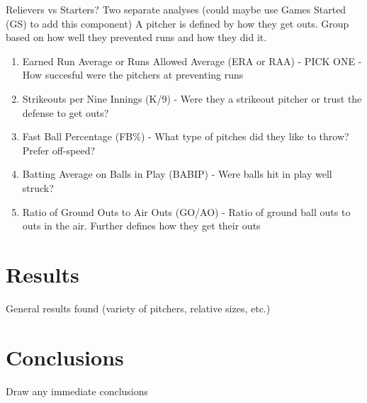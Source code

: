 \documentclass{article}
\begin{document}
Relievers vs Starters?  Two separate analyses (could maybe use Games Started (GS) to add this component)
A pitcher is defined by how they get outs.  Group based on how well they prevented runs and how they did it.
\begin{enumerate}
    \item Earned Run Average or Runs Allowed Average (ERA or RAA) - PICK ONE - How succesful were the pitchers at preventing runs

    \item Strikeouts per Nine Innings (K/9) - Were they a strikeout pitcher or trust the defense to get outs?

    \item Fast Ball Percentage (FB\%) - What type of pitches did they like to throw?  Prefer off-speed?

    \item Batting Average on Balls in Play (BABIP) - Were balls hit in play well struck?

    \item Ratio of Ground Outs to Air Outs (GO/AO) - Ratio of ground ball outs to outs in the air.  Further defines how they get their outs
\end{enumerate}
\section{Results}

General results found (variety of pitchers, relative sizes, etc.)

\section{Conclusions}

Draw any immediate conclusions 
\end{document}
